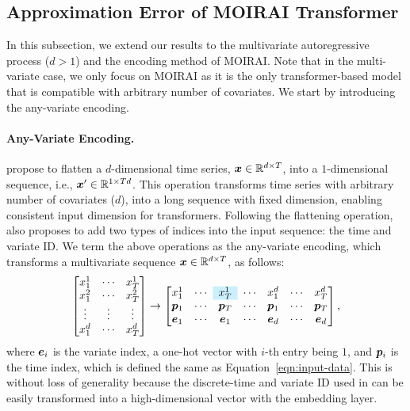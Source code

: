 \subsection{Approximation Error of MOIRAI Transformer}
In this subsection, we extend our results to the multivariate autoregressive process ($d > 1$) and the encoding method of MOIRAI.
Note that in the multi-variate case, we only focus on MOIRAI as it is the only transformer-based model that is compatible with arbitrary number of covariates. 
We start by introducing the any-variate encoding.
\paragraph{Any-Variate Encoding.}
\cite{woo2024unified} propose to flatten a $d$-dimensional time series, $\bm{x} \in \mathbb{R}^{d \times T}$, into a $1$-dimensional sequence, i.e., $\bm{x}^\prime \in \mathbb{R}^{1 \times Td}$.
This operation transforms time series with arbitrary number of covariates ($d$), into a long sequence with fixed dimension, enabling consistent input dimension for transformers.
Following the flattening operation, \cite{woo2024unified} also proposes to add two types of indices into the input sequence: the time and variate ID.
We term the above operations as the any-variate encoding, which transforms a multivariate sequence $\bm{x} \in \mathbb{R}^{d \times T}$, as follows:
{    \small
\begin{equation}\label{eqn:AV-encoding}
    \begin{bmatrix}
        x_1^1 & \cdots & x_T^1 
        \\
         x_1^2 & \cdots & x_T^2
         \\
         \vdots & \vdots & \vdots 
         \\
        x_1^d & \cdots & x_T^d    
    \end{bmatrix}
    \rightarrow
    \begin{bmatrix}
        x_1^1 & \cdots & \cellcolor{cyan!20} x_{T}^1 &  \cdots & x_1^d & \cdots & x_{T}^d
        \\
        \bp_1 & \cdots & \bp_{T} &  \cdots & \bp_1 & \cdots & \bp_T
        \\
        \be_1 & \cdots & \be_1 &  \cdots & \be_d & \cdots & \be_d
    \end{bmatrix},
\end{equation}}
where $\bm{e}_i$ is the variate index, a one-hot vector with $i$-th entry being $1$, and $\bm{p}_i$ is the time index, which is defined the same as Equation~\eqref{eqn:input-data}.
This is without loss of generality because the discrete-time and variate ID used in \cite{woo2024unified} can be easily transformed into a high-dimensional vector with the embedding layer.
